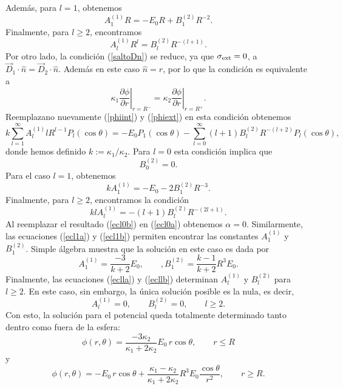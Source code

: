 Además, para $l=1$, obtenemos
\begin{equation}\label{ecl1a}
 A_1^{(1)}R =-E_0R+B_1^{(2)}R^{-2}.
\end{equation}
Finalmente, para $l\geq2$, encontramos
\begin{equation}\label{eclla}
 A_l^{(1)}R^{l} =B_l^{(2)}R^{-(l+1)}.
\end{equation}
Por otro lado, la condición (\ref{saltoDn}) se reduce, ya que $\sigma_{\rm ext}=0$, a $\vec{D}_1\cdot\hat{n}=\vec{D}_2\cdot\hat{n}$. Además en este caso $\hat{n}=\hat{r}$, por lo que la condición es equivalente a
\begin{equation}
\kappa_1\left.\frac{\partial\phi}{\partial r}\right|_{r=R^-}
=\kappa_2\left.\frac{\partial\phi}{\partial r}\right|_{r=R^+}.
\end{equation}
Reemplazano nuevamente (\ref{phiint}) y (\ref{phiext}) en esta condición obtenemos
\begin{equation}\label{condD}
 k\sum_{l=1}^{\infty}A_l^{(1)}lR^{l-1}P_l(\cos\theta) =-E_0P_1(\cos\theta)  -\sum_{l=0}^{\infty}(l+1)B_l^{(2)}R^{-(l+2)}P_l(\cos\theta),
\end{equation}
donde hemos definido $k:=\kappa_1/\kappa_2$. Para $l=0$ esta condición implica que
\begin{equation}\label{ecl0b}
B_0^{(2)}=0.
\end{equation}
Para el caso $l=1$, obtenemos
\begin{equation}\label{ecl1b}
kA_1^{(1)}  =-E_0-2B_1^{(2)}R^{-3}.
\end{equation}
Finalmente, para $l\geq2$, encontramos la condición
\begin{equation}\label{ecllb}
klA_l^{(1)} =-(l+1)B_l^{(2)}R^{-(2l+1)}.
\end{equation}
Al reemplazar el resultado (\ref{ecl0b}) en (\ref{ecl0a}) obtenemos $\alpha=0$. Similarmente, las ecuaciones (\ref{ecl1a}) y (\ref{ecl1b}) permiten encontrar las constantes $A_1^{(1)}$ y $B_1^{(2)}$. Simple álgebra muestra que la solución en este caso es dada por
\begin{equation}
 A_1^{(1)}=\frac{-3}{k+2}E_0, \qquad, B_1^{(2)}=\frac{k-1}{k+2}R^3E_0.
 \end{equation}
Finalmente, las ecuaciones (\ref{eclla}) y (\ref{ecllb}) determinan $A_l^{(1)}$ y $B_l^{(2)}$ para $l\ge 2$. En este caso, sin embargo, la única solución posible es la nula, es decir,
\begin{equation}
A_l^{(1)}=0, \qquad B_l^{(2)}=0, \qquad l\ge 2.
\end{equation}
Con esto, la solución para el potencial queda totalmente determinado tanto dentro como fuera de la esfera:
\begin{equation}
\phi(r,\theta)=\frac{-3\kappa_2}{\kappa_1+2\kappa_2}E_0\,r\cos\theta, \qquad r\le R
\end{equation}
y
\begin{equation}
\phi(r,\theta)=-E_0\,r\cos\theta +\frac{\kappa_1-\kappa_2}{\kappa_1+2\kappa_2}R^3E_0 \frac{\cos\theta}{r^2}, \qquad r\ge R.
\end{equation}
 

